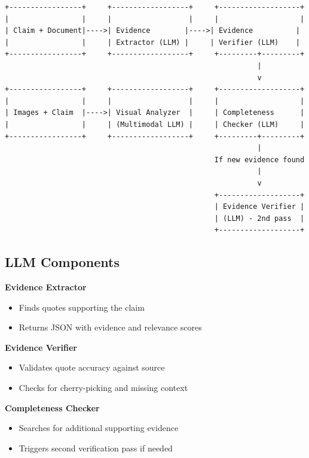 \documentclass[11pt]{article}
\begin{document}
\newpage
\begin{verbatim}
+-----------------+     +------------------+     +-------------------+
|                 |     |                  |     |                   |
| Claim + Document|---->| Evidence        |---->| Evidence          |
|                 |     | Extractor (LLM) |     | Verifier (LLM)    |
+-----------------+     +------------------+     +---------+---------+
                                                           |
                                                           v
+-----------------+     +------------------+     +-------------------+
|                 |     |                  |     |                   |
| Images + Claim  |---->| Visual Analyzer  |     | Completeness      |
|                 |     | (Multimodal LLM) |     | Checker (LLM)     |
+-----------------+     +------------------+     +---------+---------+
                                                           |
                                                 If new evidence found
                                                           |
                                                           v
                                                 +-------------------+
                                                 | Evidence Verifier |
                                                 | (LLM) - 2nd pass  |
                                                 +-------------------+
\end{verbatim}

\subsection{LLM Components}

\textbf{Evidence Extractor}
\begin{itemize}
\item Finds quotes supporting the claim
\item Returns JSON with evidence and relevance scores
\end{itemize}

\textbf{Evidence Verifier}
\begin{itemize}
\item Validates quote accuracy against source
\item Checks for cherry-picking and missing context
\end{itemize}

\textbf{Completeness Checker}
\begin{itemize}
\item Searches for additional supporting evidence
\item Triggers second verification pass if needed
\end{itemize}
\end{document}
